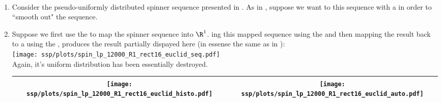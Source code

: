 \begin{example}
\label{ex:spin_lp}
\mbox{}\\
\begin{enumerate}
  \item \label{item:spin_lp_seq}
     Consider the pseudo-uniformly distributed spinner sequence presented in .
     As in , suppose we want to  this sequence with a
      in order to ``smooth out" the sequence.

  \item \label{item:spin_lp_R1_rect16_euclid}
        Suppose we first use the   
        to map the spinner sequence into $\R^1$.
        ing this mapped sequence using the  
        and then mapping the result back to a  %
        using the , produces the result partially dispayed here 
        (in essense the same as in ):
        \\\texttt{[image: ssp/plots/spin\_lp\_12000\_R1\_rect16\_euclid\_seq.pdf]}\\
        Again, it's uniform distribution has been essentially destroyed.
        \\\begin{tabular}{|>{\scs}c|>{\scs}c|}
             \hline
             \texttt{[image: ssp/plots/spin\_lp\_12000\_R1\_rect16\_euclid\_histo.pdf]}%
            &\texttt{[image: ssp/plots/spin\_lp\_12000\_R1\_rect16\_euclid\_auto.pdf]}
           \\\hline
        \end{tabular}



\end{enumerate}
\end{example}
